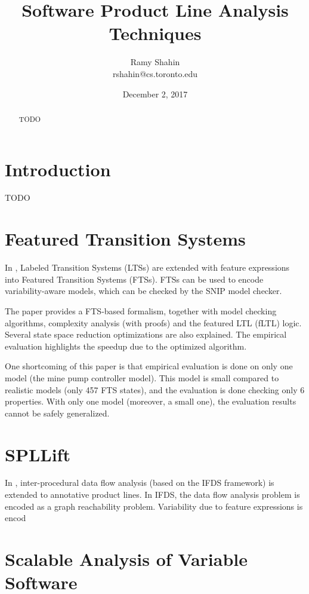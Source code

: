 \documentclass[11pt]{article}
\title{Software Product Line Analysis Techniques}
\author{Ramy Shahin \\ rshahin@cs.toronto.edu}
\date{December 2, 2017}                                           %
\begin{document}
\maketitle

\begin{abstract}
TODO
\end{abstract}

\section{Introduction}
TODO

\section{Featured Transition Systems}
\cite{Classen:2013}

In \cite{Classen:2013}, Labeled Transition Systems (LTSs) are extended with feature expressions into Featured Transition Systems (FTSs). FTSs can be used to encode variability-aware models, which can be checked by the SNIP model checker. 

The paper provides a FTS-based formalism, together with model checking algorithms, complexity analysis (with proofs) and the featured LTL (fLTL) logic. Several state space reduction optimizations are also explained. The empirical evaluation highlights the speedup due to the optimized algorithm.

One shortcoming of this paper is that empirical evaluation is done on only one model (the mine pump controller model). This model is small compared to realistic models (only 457 FTS states), and the evaluation is done checking only 6 properties. With only one model (moreover, a small one), the evaluation results cannot be safely generalized. 
 
\section{SPLLift}
\cite{Bodden:2013}

In \cite{Bodden:2013}, inter-procedural data flow analysis (based on the IFDS framework) is extended to annotative product lines. In IFDS, the data flow analysis problem is encoded as a graph reachability problem. Variability due to feature expressions is encod 

\section{Scalable Analysis of Variable Software}
\cite{Liebig:2013}
\end{document}
